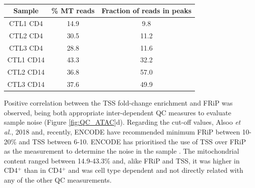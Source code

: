 \begin{table}[htbp]
\begin{tabular}{@{} c c c}
\toprule
\textbf{Sample} & \textbf{\% MT reads} & \textbf{Fraction of reads in peaks} \\
\midrule
\midrule
CTL1 CD4 & 14.9 & 9.8 \\
CTL2 CD4 & 30.5 & 11.2 \\
CTL3 CD4 & 28.8 & 11.6 \\
CTL1 CD14 & 43.3 & 32.2 \\
CTL2 CD14 & 36.8 & 57.0 \\
CTL3 CD14 & 37.6 & 49.9 \\
\bottomrule
\end{tabular}
\medskip %
\caption[ATAC-seq percentage of MT reads and fraction of reads in called peaks]{\textbf{}}
\label{tab:ATAC_MT_fraction_reads_in_peaks}
\end{table}
\bigskip %


Positive correlation between the TSS fold-change enrichment and FRiP was observed, being both appropriate inter-dependent QC measures to evaluate sample noise (Figure \ref{fig:QC_ATAC}d). Regarding the cut-off values, Alsoo \textit{et al.}, 2018 and, recently, ENCODE have recommended minimum FRiP between 10-20\% and TSS between 6-10. ENCODE has prioritised the use of TSS over FRiP as the measurement to determine the noise in the sample \parencite{ENCODE}. The mitochondrial content ranged between 14.9-43.3\% and, alike FRiP and TSS, it was higher in CD4$^+$ than in CD4$^+$ and was cell type dependent and not directly related with any of the other QC measurements.



